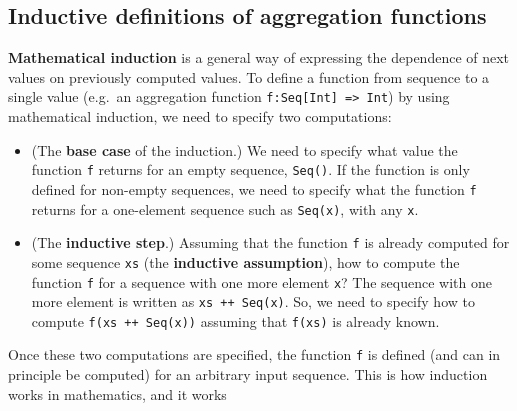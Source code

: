 \subsection{Inductive definitions of aggregation functions\label{subsec:Inductive-definitions-of-aggregation-functions}}

\textbf{Mathematical induction} is
a general way of expressing the dependence of next values on previously
computed values. To define a function from sequence to a single value
(e.g.~an aggregation function \lstinline!f:Seq[Int] => Int!)
by using mathematical induction, we need to specify two computations:
\begin{itemize}
\item (\textbf{}The \textbf{base
case} of the induction.) We need to specify what value the function
\lstinline!f! returns for
an empty sequence, \lstinline!Seq()!.
If the function is only defined for non-empty sequences, we need to
specify what the function \lstinline!f!
returns for a one-element sequence such as \lstinline!Seq(x)!,
with any \lstinline!x!.
\item (\textbf{}The \textbf{inductive
step}.) Assuming that the function \lstinline!f!
is already computed for some sequence \lstinline!xs!
(the \textbf{inductive
assumption}), how to compute the function \lstinline!f!
for a sequence with one more element \lstinline!x!?
The sequence with one more element is written as \lstinline!xs ++ Seq(x)!.
So, we need to specify how to compute \lstinline!f(xs ++ Seq(x))!
assuming that \lstinline!f(xs)!
is already known.
\end{itemize}
Once these two computations are specified, the function \lstinline!f!
is defined (and can in principle be computed) for an arbitrary input
sequence. This is how induction works in mathematics, and it works
